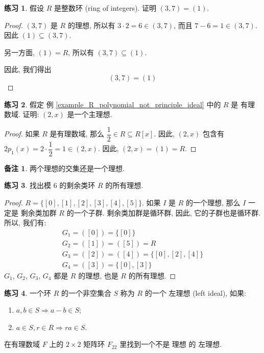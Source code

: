 \documentclass[utf8]{ctexbook}
\theoremstyle{definition}
\newtheorem{memo}{备注}[section]
\newtheorem{exercise}{练习}[section]
\begin{document}
\begin{exercise}
假设 $R$ 是整数环 (ring of integers). 证明 $(3, 7) = (1)$.
\end{exercise}


\begin{proof}
$(3,7)$ 是 $R$ 的理想, 所以有 $3 \cdot 2 = 6 \in (3,7)$, 而且 $7 - 6 = 1 \in (3, 7)$. 因此 $(1) \subseteq (3,7)$.

另一方面, $(1) = R$, 所以有 $(3, 7) \subseteq (1)$.

因此, 我们得出
\begin{equation}
(3, 7) = (1) \nonumber
\end{equation}

\end{proof}


\begin{exercise}\label{example_2_x_is_max_ideal}
假定 例 \ref{example_R_polynomial_not_principle_ideal} 中的 $R$ 是 有理数域. 证明: $(2,x)$ 是一个主理想.
\end{exercise}

\begin{proof}
如果 $R$ 是有理数域, 那么 $\dfrac{1}{2} \in  R \subseteq R[x]$. 因此, $(2, x)$ 包含有 $2 p_1(x) = 2 \cdot \dfrac{1}{2} = 1 \in (2, x)$. 因此, $(2,x) = (1) = R$.
\end{proof}

\begin{memo}
两个理想的交集还是一个理想.
\end{memo}


\begin{exercise}
找出模 $6$ 的剩余类环 $R$ 的所有理想.
\end{exercise}

\begin{proof}
$R =\{[0], [1], [2], [3], [4], [5]  \}$. 如果 $I$ 是 $R$ 的一个理想, 那么 $I$ 一定是 剩余类加群 $R$ 的一个子群. 剩余类加群是循环群, 因此, 它的子群也是循环群. 所以, 我们有:
\begin{align*}
G_1 = ([0]) = \{ [0] \} \\
G_2 = ([1]) = ([5]) = R \\
G_3 = ([2]) = ([4]) = \{ [0], [2], [4] \} \\
G_4 = ([3]) = \{ [0], [3] \}
\end{align*}
$G_1$, $G_2$, $G_3$, $G_4$ 都是 $R$ 的理想, 也是 $R$ 的所有理想.
\end{proof}

\begin{exercise}
一个环 $R$ 的一个非空集合 $S$ 称为 $R$ 的一个 左理想 (left ideal), 如果:
\begin{enumerate}
\item{$a, b\in S \Longrightarrow a-b \in S$;}
\item{$a \in S, r \in R \Longrightarrow r a \in S$.}
\end{enumerate}

在有理数域 $F$ 上的 $2 \times 2$ 矩阵环 $F_{22}$ 里找到一个不是 理想 的 左理想.
\end{exercise}
\end{document}
